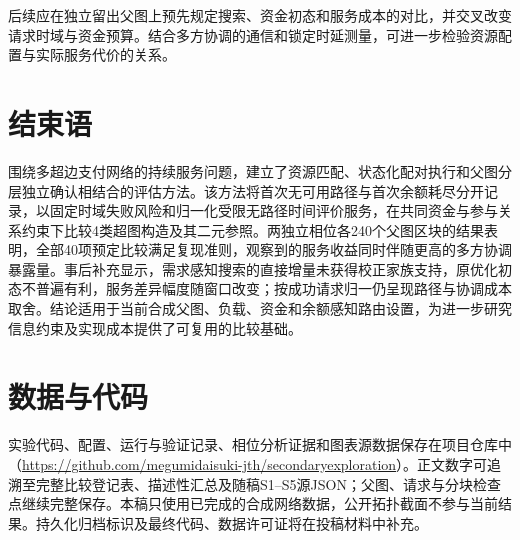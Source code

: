 \documentclass[UTF8,a4paper,twocolumn,fontset=none,zihao=5]{ctexart}
\begin{document}
后续应在独立留出父图上预先规定搜索、资金初态和服务成本的对比，并交叉改变请求时域与资金预算。结合多方协调的通信和锁定时延测量，可进一步检验资源配置与实际服务代价的关系。


\section{结束语}

围绕多超边支付网络的持续服务问题，建立了资源匹配、状态化配对执行和父图分层独立确认相结合的评估方法。该方法将首次无可用路径与首次余额耗尽分开记录，以固定时域失败风险和归一化受限无路径时间评价服务，在共同资金与参与关系约束下比较4类超图构造及其二元参照。两独立相位各240个父图区块的结果表明，全部40项预定比较满足复现准则，观察到的服务收益同时伴随更高的多方协调暴露量。事后补充显示，需求感知搜索的直接增量未获得校正家族支持，原优化初态不普遍有利，服务差异幅度随窗口改变；按成功请求归一仍呈现路径与协调成本取舍。结论适用于当前合成父图、负载、资金和余额感知路由设置，为进一步研究信息约束及实现成本提供了可复用的比较基础。


\section*{数据与代码}

实验代码、配置、运行与验证记录、相位分析证据和图表源数据保存在项目仓库中（\url{https://github.com/megumidaisuki-jth/secondaryexploration}）。正文数字可追溯至完整比较登记表、描述性汇总及随稿S1–S5源JSON；父图、请求与分块检查点继续完整保存。本稿只使用已完成的合成网络数据，公开拓扑截面不参与当前结果。持久化归档标识及最终代码、数据许可证将在投稿材料中补充。
\end{document}

